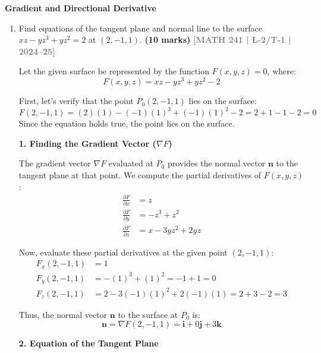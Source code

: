 \documentclass[12pt,a4paper]{article}
\newcommand{\yr}[1]{\hfill\textcolor{gray}{\small\textbf{[#1]}}}
\newcommand{\mk}[1]{\textcolor{orange!70!black}{\small\textbf{(#1 marks)}}}
\newcommand{\subtopic}[2]{%
  \vspace{10pt}
  \noindent\begin{tcolorbox}[colback=#1!8,colframe=#1,boxrule=0.6pt,arc=4pt,
    left=6pt,right=6pt,top=4pt,bottom=4pt]
    \small\bfseries\textcolor{#1}{#2}
  \end{tcolorbox}
  \vspace{2pt}
}
\begin{document}
\subtopic{cD}{Gradient and Directional Derivative}
\label{sub:s4-gradeint}

\begin{enumerate}
    
\item Find equations of the tangent plane and normal line to the surface $xz-yz^{3}+yz^{2}=2$ at $(2,-1,1)$.
\mk{10} \yr{MATH 241 | L-2/T-1 | 2024--25}

\begin{tcolorbox}[enhanced,breakable,ansbox,colback=cD!4,colframe=cD,boxrule=0.8pt,arc=5pt,title={\textbf{Answer}},fonttitle=\bfseries\color{white},colbacktitle=cD]

Let the given surface be represented by the function $F(x, y, z) = 0$, where:
\[ F(x, y, z) = xz - yz^3 + yz^2 - 2 \]

First, let's verify that the point $P_0(2, -1, 1)$ lies on the surface:
\[ F(2, -1, 1) = (2)(1) - (-1)(1)^3 + (-1)(1)^2 - 2 = 2 + 1 - 1 - 2 = 0 \]
Since the equation holds true, the point lies on the surface.

\vspace{1em}
\textbf{1. Finding the Gradient Vector ($\nabla F$)}

The gradient vector $\nabla F$ evaluated at $P_0$ provides the normal vector $\mathbf{n}$ to the tangent plane at that point. We compute the partial derivatives of $F(x, y, z)$:
\begin{align*}
    \frac{\partial F}{\partial x} &= z \\
    \frac{\partial F}{\partial y} &= -z^3 + z^2 \\
    \frac{\partial F}{\partial z} &= x - 3yz^2 + 2yz
\end{align*}

Now, evaluate these partial derivatives at the given point $(2, -1, 1)$:
\begin{align*}
    F_x(2, -1, 1) &= 1 \\
    F_y(2, -1, 1) &= -(1)^3 + (1)^2 = -1 + 1 = 0 \\
    F_z(2, -1, 1) &= 2 - 3(-1)(1)^2 + 2(-1)(1) = 2 + 3 - 2 = 3
\end{align*}

Thus, the normal vector $\mathbf{n}$ to the surface at $P_0$ is:
\[ \mathbf{n} = \nabla F(2, -1, 1) = \mathbf{i} + 0\mathbf{j} + 3\mathbf{k} \]

\vspace{1em}
\textbf{2. Equation of the Tangent Plane}


\end{tcolorbox}
\end{enumerate}
\end{document}
